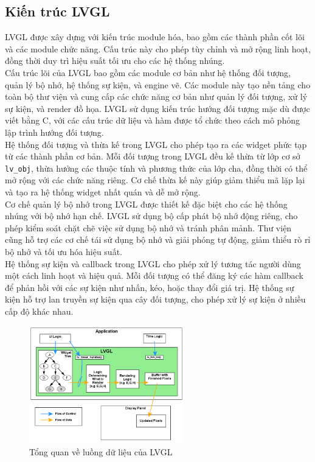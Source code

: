 \subsection{Kiến trúc LVGL}
\tab LVGL được xây dựng với kiến trúc module hóa, bao gồm các thành phần cốt lõi và các module chức năng. Cấu trúc này cho phép tùy chỉnh và mở rộng linh hoạt, đồng thời duy trì hiệu suất tối ưu cho các hệ thống nhúng.\\
\tab Cấu trúc lõi của LVGL bao gồm các module cơ bản như hệ thống đối tượng, quản lý bộ nhớ, hệ thống sự kiện, và engine vẽ. Các module này tạo nền tảng cho toàn bộ thư viện và cung cấp các chức năng cơ bản như quản lý đối tượng, xử lý sự kiện, và render đồ họa. LVGL sử dụng kiến trúc hướng đối tượng mặc dù được viết bằng C, với các cấu trúc dữ liệu và hàm được tổ chức theo cách mô phỏng lập trình hướng đối tượng.\\
\tab Hệ thống đối tượng và thừa kế trong LVGL cho phép tạo ra các widget phức tạp từ các thành phần cơ bản. Mỗi đối tượng trong LVGL đều kế thừa từ lớp cơ sở \texttt{lv\_obj}, thừa hưởng các thuộc tính và phương thức của lớp cha, đồng thời có thể mở rộng với các chức năng riêng. Cơ chế thừa kế này giúp giảm thiểu mã lặp lại và tạo ra hệ thống widget nhất quán và dễ mở rộng.\\
\tab Cơ chế quản lý bộ nhớ trong LVGL được thiết kế đặc biệt cho các hệ thống nhúng với bộ nhớ hạn chế. LVGL sử dụng bộ cấp phát bộ nhớ động riêng, cho phép kiểm soát chặt chẽ việc sử dụng bộ nhớ và tránh phân mảnh. Thư viện cũng hỗ trợ các cơ chế tái sử dụng bộ nhớ và giải phóng tự động, giảm thiểu rò rỉ bộ nhớ và tối ưu hóa hiệu suất.\\
\tab Hệ thống sự kiện và callback trong LVGL cho phép xử lý tương tác người dùng một cách linh hoạt và hiệu quả. Mỗi đối tượng có thể đăng ký các hàm callback để phản hồi với các sự kiện như nhấn, kéo, hoặc thay đổi giá trị. Hệ thống sự kiện hỗ trợ lan truyền sự kiện qua cây đối tượng, cho phép xử lý sự kiện ở nhiều cấp độ khác nhau.
\begin{figure}[H]
  \centering
  \includegraphics[width=0.6\textwidth]{Images/LGVL_intro_data_flow.png}
  \caption{Tổng quan về luồng dữ liệu của LVGL}
\end{figure}
